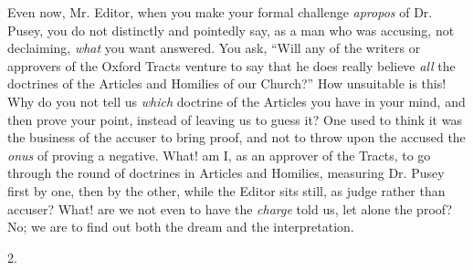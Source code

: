 Even now, Mr. Editor, when you make your formal
challenge \emph{apropos} of Dr. Pusey, you do not distinctly and
pointedly say, as a man who was accusing, not declaiming, \emph{what}
you want answered. You ask, ``Will any of the writers or approvers of
the Oxford Tracts venture to say that he does really believe \emph{all}
the doctrines of the Articles and Homilies of our Church?'' How
unsuitable is this! Why do you not tell us \emph{which} doctrine of
the Articles you have in your mind, and then prove your point, instead
of leaving us to guess it? One used to think it was the business of
the accuser to bring proof, and not to throw upon the accused the \emph{onus}
of proving a negative. What! am I, as an approver of the Tracts, to go
through the round of doctrines in Articles and Homilies,
measuring Dr. Pusey first by one, then by the other, while the Editor
sits still, as judge rather than accuser? What! are we not even to
have the \emph{charge} told us, let alone the proof? No; we are to
find out both the dream and the interpretation.

2.

